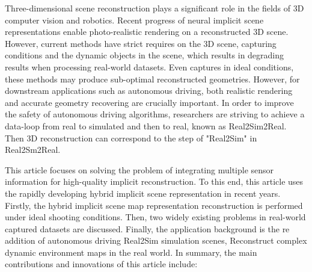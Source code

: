\begin{abstractEn}
Three-dimensional scene reconstruction plays a significant role in the fields of 3D computer vision and robotics. 
Recent progress of neural implicit scene representations enable photo-realistic rendering on a reconstructed 3D scene. However, current methods have strict requires on the 3D scene, capturing conditions and the dynamic objects in the scene, which results in degrading results when processing real-world datasets. Even captures in ideal conditions, these methods may produce sub-optimal reconstructed geometries.  However, for downstream applications such as autonomous driving, both realistic rendering and accurate geometry recovering are crucially important. In order to improve the safety of autonomous driving algorithms, researchers are striving to achieve a data-loop from real to simulated and then to real, known as Real2Sim2Real. Then 3D reconstruction can correspond to the step of "Real2Sim" in Real2Sm2Real.

This article focuses on solving the problem of integrating multiple sensor information for high-quality implicit reconstruction. To this end, this article uses the rapidly developing hybrid implicit scene representation in recent years. Firstly, the hybrid implicit scene map representation reconstruction is performed under ideal shooting conditions. Then, two widely existing problems in real-world captured datasets are discussed. Finally, the application background is the re addition of autonomous driving Real2Sim simulation scenes, Reconstruct complex dynamic environment maps in the real world. In summary, the main contributions and innovations of this article include:


\end{abstractEn}
